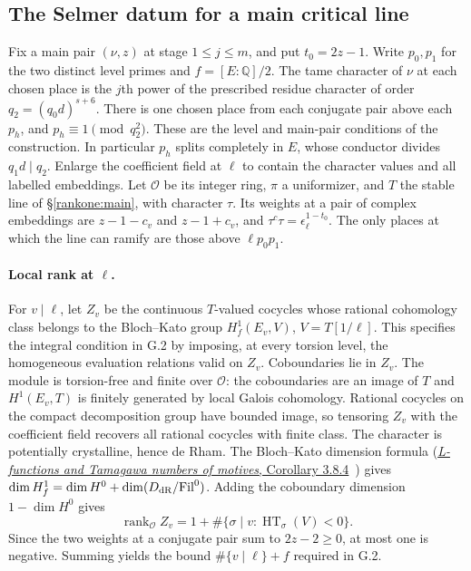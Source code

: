 \subsection{The Selmer datum for a main critical line}\label{moment:line}

Fix a main pair $(\nu,z)$ at stage $1\leq j\leq m$, and put $t_0=2z-1$.
Write $p_0,p_1$ for the two distinct level primes and $f=[E:\mathbb Q]/2$.
The tame character of $\nu$ at each chosen place is the $j$th power of
the prescribed residue character of order $q_2=(q_0d)^{s+6}$.
There is one chosen place from each conjugate pair above each $p_h$,
and $p_h\equiv 1\pmod {q_2^2}$. These are the level and main-pair
conditions of the construction. In particular $p_h$ splits completely in $E$,
whose conductor divides $q_1d\mid q_2$. Enlarge the coefficient field
at $\ell$ to contain the character values and all labelled embeddings.
Let $\mathcal O$ be its integer ring, $\pi$ a uniformizer, and $T$ the
stable line of \S\ref{rankone:main}, with character $\tau$.
Its weights at a pair of complex embeddings are $z-1-c_v$ and $z-1+c_v$,
and $\tau^c\tau=\epsilon_\ell^{1-t_0}$.
The only places at which the line can ramify are those above
$\ell p_0p_1$.

\paragraph{Local rank at $\ell$.}
For $v\mid\ell$, let $Z_v$ be the continuous $T$-valued cocycles whose
rational cohomology class belongs to the Bloch--Kato group
$H^1_f(E_v,V)$, $V=T[1/\ell]$. This specifies the integral condition
in G.2 by imposing, at every torsion level, the homogeneous evaluation
relations valid on $Z_v$. Coboundaries lie in $Z_v$. The module is
torsion-free and finite over $\mathcal O$: the coboundaries are an
image of $T$ and $H^1(E_v,T)$ is finitely generated by local Galois
cohomology. Rational cocycles on the compact decomposition group
have bounded image, so tensoring $Z_v$ with the coefficient field
recovers all rational cocycles with finite class. The character is
potentially crystalline, hence de Rham. The Bloch--Kato dimension formula
(\href{https://virtualmath1.stanford.edu/~conrad/BSDseminar/refs/BKTamagawa.pdf}{\emph{L-functions and Tamagawa numbers of motives}, Corollary 3.8.4}~\cite{bk})
gives $\dim H^1_f=\dim H^0+\dim(D_{\rm dR}/\mathrm{Fil}^0)$.
Adding the coboundary dimension $1-\dim H^0$ gives
\[
  \operatorname{rank}_{\mathcal O} Z_v
  =1+\#\{\sigma\mid v : \operatorname{HT}_{\sigma}(V)<0\}.
\]
Since the two weights at a conjugate pair sum to $2z-2\geq0$, at most
one is negative. Summing yields the bound $\#\{v\mid\ell\}+f$
required in G.2.

